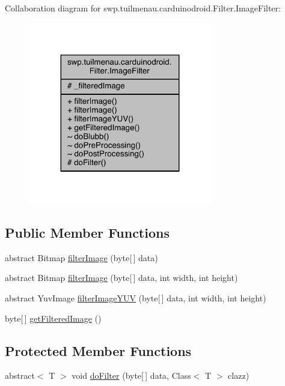 Collaboration diagram for swp.\+tuilmenau.\+carduinodroid.\+Filter.\+Image\+Filter\+:
\nopagebreak
\begin{figure}[H]
\begin{center}
\leavevmode
\includegraphics[width=227pt]{classswp_1_1tuilmenau_1_1carduinodroid_1_1_filter_1_1_image_filter__coll__graph}
\end{center}
\end{figure}
\subsection*{Public Member Functions}
\begin{DoxyCompactItemize}
\item 
abstract Bitmap \hyperlink{classswp_1_1tuilmenau_1_1carduinodroid_1_1_filter_1_1_image_filter_afe4620095971cd9f370dea4ef4927bbc}{filter\+Image} (byte\mbox{[}$\,$\mbox{]} data)
\item 
abstract Bitmap \hyperlink{classswp_1_1tuilmenau_1_1carduinodroid_1_1_filter_1_1_image_filter_a53502ae5b361e9c5aafb0ef8e1c114b2}{filter\+Image} (byte\mbox{[}$\,$\mbox{]} data, int width, int height)
\item 
abstract Yuv\+Image \hyperlink{classswp_1_1tuilmenau_1_1carduinodroid_1_1_filter_1_1_image_filter_a1b9f146096c5a3364ea740f770470722}{filter\+Image\+Y\+U\+V} (byte\mbox{[}$\,$\mbox{]} data, int width, int height)
\item 
byte\mbox{[}$\,$\mbox{]} \hyperlink{classswp_1_1tuilmenau_1_1carduinodroid_1_1_filter_1_1_image_filter_a96a2cfa716c71ec05a118c664e63bfe5}{get\+Filtered\+Image} ()
\end{DoxyCompactItemize}
\subsection*{Protected Member Functions}
\begin{DoxyCompactItemize}
\item 
abstract$<$ T $>$ void \hyperlink{classswp_1_1tuilmenau_1_1carduinodroid_1_1_filter_1_1_image_filter_a9f116db5e228c51c7b8d8b9bcdba7ac4}{do\+Filter} (byte\mbox{[}$\,$\mbox{]} data, Class$<$ T $>$ clazz)
\end{DoxyCompactItemize}

